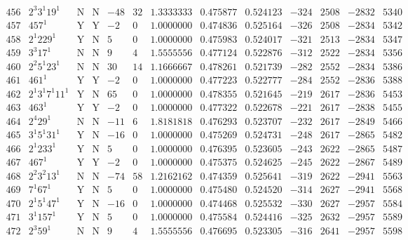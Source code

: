 \documentclass[11pt,reqno,a4letter]{article}
\numberwithin{equation}{section}
\numberwithin{figure}{section}
\numberwithin{table}{section}
\theoremstyle{plain}
\numberwithin{theorem}{section}
\theoremstyle{definition}
\begin{document}
\begin{table}[ht]
\begin{equation*}
{\begin{array}{cc|cc|ccc|cc|cccc}
 456 & 2^3 3^1 19^1 & \text{N} & \text{N} & -48 & 32 & 1.3333333 & 0.475877 & 0.524123 & -324 & 2508 & -2832 & 5340 \\
 457 & 457^1 & \text{Y} & \text{Y} & -2 & 0 & 1.0000000 & 0.474836 & 0.525164 & -326 & 2508 & -2834 & 5342 \\
 458 & 2^1 229^1 & \text{Y} & \text{N} & 5 & 0 & 1.0000000 & 0.475983 & 0.524017 & -321 & 2513 & -2834 & 5347 \\
 459 & 3^3 17^1 & \text{N} & \text{N} & 9 & 4 & 1.5555556 & 0.477124 & 0.522876 & -312 & 2522 & -2834 & 5356 \\
 460 & 2^2 5^1 23^1 & \text{N} & \text{N} & 30 & 14 & 1.1666667 & 0.478261 & 0.521739 & -282 & 2552 & -2834 & 5386 \\
 461 & 461^1 & \text{Y} & \text{Y} & -2 & 0 & 1.0000000 & 0.477223 & 0.522777 & -284 & 2552 & -2836 & 5388 \\
 462 & 2^1 3^1 7^1 11^1 & \text{Y} & \text{N} & 65 & 0 & 1.0000000 & 0.478355 & 0.521645 & -219 & 2617 & -2836 & 5453 \\
 463 & 463^1 & \text{Y} & \text{Y} & -2 & 0 & 1.0000000 & 0.477322 & 0.522678 & -221 & 2617 & -2838 & 5455 \\
 464 & 2^4 29^1 & \text{N} & \text{N} & -11 & 6 & 1.8181818 & 0.476293 & 0.523707 & -232 & 2617 & -2849 & 5466 \\
 465 & 3^1 5^1 31^1 & \text{Y} & \text{N} & -16 & 0 & 1.0000000 & 0.475269 & 0.524731 & -248 & 2617 & -2865 & 5482 \\
 466 & 2^1 233^1 & \text{Y} & \text{N} & 5 & 0 & 1.0000000 & 0.476395 & 0.523605 & -243 & 2622 & -2865 & 5487 \\
 467 & 467^1 & \text{Y} & \text{Y} & -2 & 0 & 1.0000000 & 0.475375 & 0.524625 & -245 & 2622 & -2867 & 5489 \\
 468 & 2^2 3^2 13^1 & \text{N} & \text{N} & -74 & 58 & 1.2162162 & 0.474359 & 0.525641 & -319 & 2622 & -2941 & 5563 \\
 469 & 7^1 67^1 & \text{Y} & \text{N} & 5 & 0 & 1.0000000 & 0.475480 & 0.524520 & -314 & 2627 & -2941 & 5568 \\
 470 & 2^1 5^1 47^1 & \text{Y} & \text{N} & -16 & 0 & 1.0000000 & 0.474468 & 0.525532 & -330 & 2627 & -2957 & 5584 \\
 471 & 3^1 157^1 & \text{Y} & \text{N} & 5 & 0 & 1.0000000 & 0.475584 & 0.524416 & -325 & 2632 & -2957 & 5589 \\
 472 & 2^3 59^1 & \text{N} & \text{N} & 9 & 4 & 1.5555556 & 0.476695 & 0.523305 & -316 & 2641 & -2957 & 5598 \\

\end{array}}
\end{equation*}
\end{table}
\end{document}
